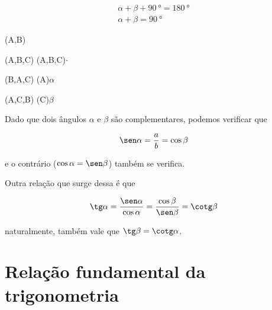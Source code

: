 \begin{multicols}{2}
	\begin{gather*}
		\alpha + \beta + \SI{90}{\degree}=\SI{180}{\degree}\\
		\alpha + \beta = \SI{90}{\degree}
	\end{gather*}

	\vfill\null
	\columnbreak

	\begin{tikzscale}[0.8]
		\tkzDrawTriangle[pythagore](A,B)

		\tkzMarkRightAngle[line width=0.3pt](A,B,C)
		\tkzLabelAngle[pos=0.15](A,B,C){\small$\cdot$}

		\tkzMarkAngle[size=1](B,A,C)
		\tkzLabelPoint[xshift=0.71cm, yshift=14pt](A){$\alpha$}

		\tkzMarkAngle[size=0.8](A,C,B)
		\tkzLabelPoint[xshift=-18pt, yshift=-15pt](C){$\beta$}
	\end{tikzscale}
\end{multicols}

Dado que dois ângulos $\alpha$ e $\beta$ são complementares, podemos verificar que

$$
	\sen \alpha=\frac{a}{b}=\cos\beta
$$

e o contrário ($\cos\alpha=\sen\beta$) também se verifica.

Outra relação que surge dessa é que

$$
	\tg\alpha=\frac{\sen\alpha}{\cos\alpha}=\frac{\cos\beta}{\sen\beta}=\cotg\beta
$$

naturalmente, também vale que $\tg\beta=\cotg\alpha$.

\section{Relação fundamental da trigonometria}

